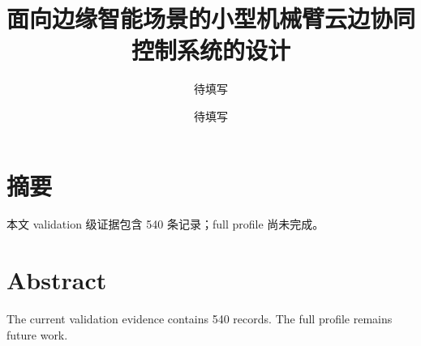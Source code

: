 \documentclass[UTF8]{ctexbook}
\title{面向边缘智能场景的小型机械臂云边协同控制系统的设计}
\author{待填写}
\date{待填写}
\begin{document}
\maketitle
\tableofcontents
\chapter*{摘要}
本文 validation 级证据包含 540 条记录；full profile 尚未完成。\par
\chapter*{Abstract}
The current validation evidence contains 540 records. The full profile remains future work.\par













\nocite{*}


\end{document}
